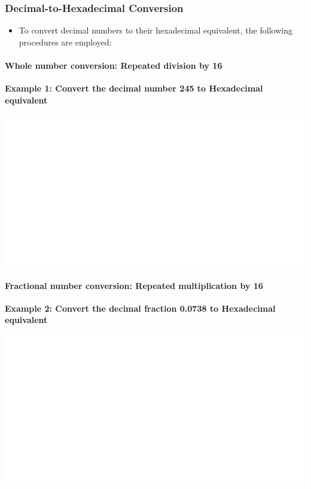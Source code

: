 \documentclass[]{book}
\providecommand{\tightlist}{%
  \setlength{\itemsep}{0pt}\setlength{\parskip}{0pt}}
\let\oldparagraph\paragraph
\renewcommand{\paragraph}[1]{\oldparagraph{#1}\mbox{}}
\begin{document}
\hypertarget{decimal-to-hexadecimal-conversion}{%
\subsubsection{Decimal-to-Hexadecimal Conversion}\label{decimal-to-hexadecimal-conversion}}

\begin{itemize}
\tightlist
\item
  To convert decimal numbers to their hexadecimal equivalent, the following procedures are employed:
\end{itemize}

\hypertarget{whole-number-conversion-repeated-division-by-16}{%
\paragraph{Whole number conversion: Repeated division by 16}\label{whole-number-conversion-repeated-division-by-16}}

\textbf{Example 1: Convert the decimal number 245 to Hexadecimal equivalent}

\begin{center}\includegraphics[width=1\linewidth]{figure/NSbox15-1} \end{center}

\hypertarget{fractional-number-conversion-repeated-multiplication-by-16}{%
\paragraph{Fractional number conversion: Repeated multiplication by 16}\label{fractional-number-conversion-repeated-multiplication-by-16}}

\textbf{Example 2: Convert the decimal fraction 0.0738 to Hexadecimal equivalent}

\begin{center}\includegraphics[width=1\linewidth]{figure/NSbox16-1} \end{center}
\end{document}
